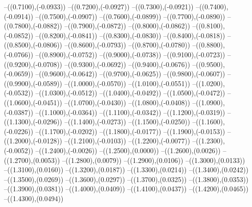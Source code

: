 {	--({\sx*(0.7100)},{\sy*(-0.0933)})
	--({\sx*(0.7200)},{\sy*(-0.0927)})
	--({\sx*(0.7300)},{\sy*(-0.0921)})
	--({\sx*(0.7400)},{\sy*(-0.0914)})
	--({\sx*(0.7500)},{\sy*(-0.0907)})
	--({\sx*(0.7600)},{\sy*(-0.0899)})
	--({\sx*(0.7700)},{\sy*(-0.0890)})
	--({\sx*(0.7800)},{\sy*(-0.0882)})
	--({\sx*(0.7900)},{\sy*(-0.0872)})
	--({\sx*(0.8000)},{\sy*(-0.0862)})
	--({\sx*(0.8100)},{\sy*(-0.0852)})
	--({\sx*(0.8200)},{\sy*(-0.0841)})
	--({\sx*(0.8300)},{\sy*(-0.0830)})
	--({\sx*(0.8400)},{\sy*(-0.0818)})
	--({\sx*(0.8500)},{\sy*(-0.0806)})
	--({\sx*(0.8600)},{\sy*(-0.0793)})
	--({\sx*(0.8700)},{\sy*(-0.0780)})
	--({\sx*(0.8800)},{\sy*(-0.0766)})
	--({\sx*(0.8900)},{\sy*(-0.0752)})
	--({\sx*(0.9000)},{\sy*(-0.0738)})
	--({\sx*(0.9100)},{\sy*(-0.0723)})
	--({\sx*(0.9200)},{\sy*(-0.0708)})
	--({\sx*(0.9300)},{\sy*(-0.0692)})
	--({\sx*(0.9400)},{\sy*(-0.0676)})
	--({\sx*(0.9500)},{\sy*(-0.0659)})
	--({\sx*(0.9600)},{\sy*(-0.0642)})
	--({\sx*(0.9700)},{\sy*(-0.0625)})
	--({\sx*(0.9800)},{\sy*(-0.0607)})
	--({\sx*(0.9900)},{\sy*(-0.0589)})
	--({\sx*(1.0000)},{\sy*(-0.0570)})
	--({\sx*(1.0100)},{\sy*(-0.0551)})
	--({\sx*(1.0200)},{\sy*(-0.0532)})
	--({\sx*(1.0300)},{\sy*(-0.0512)})
	--({\sx*(1.0400)},{\sy*(-0.0492)})
	--({\sx*(1.0500)},{\sy*(-0.0472)})
	--({\sx*(1.0600)},{\sy*(-0.0451)})
	--({\sx*(1.0700)},{\sy*(-0.0430)})
	--({\sx*(1.0800)},{\sy*(-0.0408)})
	--({\sx*(1.0900)},{\sy*(-0.0387)})
	--({\sx*(1.1000)},{\sy*(-0.0364)})
	--({\sx*(1.1100)},{\sy*(-0.0342)})
	--({\sx*(1.1200)},{\sy*(-0.0319)})
	--({\sx*(1.1300)},{\sy*(-0.0296)})
	--({\sx*(1.1400)},{\sy*(-0.0273)})
	--({\sx*(1.1500)},{\sy*(-0.0250)})
	--({\sx*(1.1600)},{\sy*(-0.0226)})
	--({\sx*(1.1700)},{\sy*(-0.0202)})
	--({\sx*(1.1800)},{\sy*(-0.0177)})
	--({\sx*(1.1900)},{\sy*(-0.0153)})
	--({\sx*(1.2000)},{\sy*(-0.0128)})
	--({\sx*(1.2100)},{\sy*(-0.0103)})
	--({\sx*(1.2200)},{\sy*(-0.0077)})
	--({\sx*(1.2300)},{\sy*(-0.0052)})
	--({\sx*(1.2400)},{\sy*(-0.0026)})
	--({\sx*(1.2500)},{\sy*(0.0000)})
	--({\sx*(1.2600)},{\sy*(0.0026)})
	--({\sx*(1.2700)},{\sy*(0.0053)})
	--({\sx*(1.2800)},{\sy*(0.0079)})
	--({\sx*(1.2900)},{\sy*(0.0106)})
	--({\sx*(1.3000)},{\sy*(0.0133)})
	--({\sx*(1.3100)},{\sy*(0.0160)})
	--({\sx*(1.3200)},{\sy*(0.0187)})
	--({\sx*(1.3300)},{\sy*(0.0214)})
	--({\sx*(1.3400)},{\sy*(0.0242)})
	--({\sx*(1.3500)},{\sy*(0.0269)})
	--({\sx*(1.3600)},{\sy*(0.0297)})
	--({\sx*(1.3700)},{\sy*(0.0325)})
	--({\sx*(1.3800)},{\sy*(0.0353)})
	--({\sx*(1.3900)},{\sy*(0.0381)})
	--({\sx*(1.4000)},{\sy*(0.0409)})
	--({\sx*(1.4100)},{\sy*(0.0437)})
	--({\sx*(1.4200)},{\sy*(0.0465)})
	--({\sx*(1.4300)},{\sy*(0.0494)})
}
